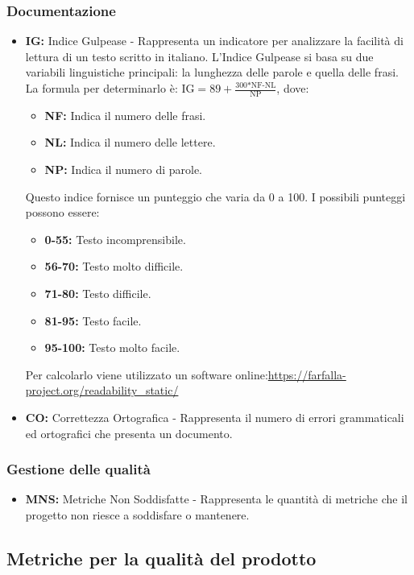 \subsubsection{Documentazione}
\begin{itemize}
    \item \textbf{IG:} Indice Gulpease - Rappresenta un indicatore per analizzare la facilità di lettura di un testo scritto in italiano. L’Indice Gulpease si basa su due variabili linguistiche principali: la lunghezza delle parole e quella delle frasi. \\
    La formula per determinarlo è: \( \text{IG} = 89+\frac{\text{300*NF-NL}}{\text{NP}} \), dove:
    \begin{itemize}
        \item \textbf{NF:} Indica il numero delle frasi.
        \item \textbf{NL:} Indica il numero delle lettere.
        \item \textbf{NP:} Indica il numero di parole.
    \end{itemize}
    Questo indice fornisce un punteggio che varia da 0 a 100. I possibili punteggi possono essere:
    \begin{itemize}
        \item \textbf{0-55:} Testo incomprensibile.
        \item \textbf{56-70:} Testo molto difficile.
        \item \textbf{71-80:} Testo difficile.
        \item \textbf{81-95:} Testo facile.
        \item \textbf{95-100:} Testo molto facile.
    \end{itemize}
    Per calcolarlo viene utilizzato un software online:\url{https://farfalla-project.org/readability_static/}
    \item \textbf{CO:} Correttezza Ortografica - Rappresenta il numero di errori grammaticali ed ortografici che presenta un documento.
\end{itemize}
\subsubsection{Gestione delle qualità}
\begin{itemize}
    \item \textbf{MNS:} Metriche Non Soddisfatte - Rappresenta le quantità di metriche che il progetto non riesce a soddisfare o mantenere.
\end{itemize}
\newpage
\subsection{Metriche per la qualità del prodotto}
